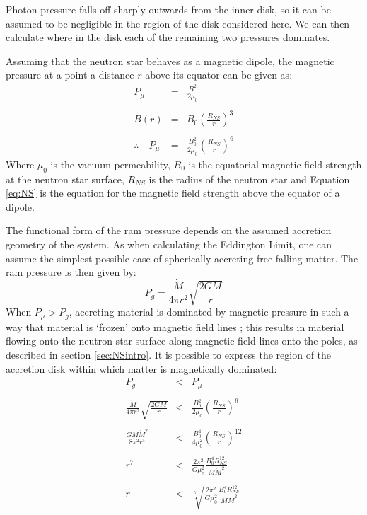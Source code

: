 \par Photon pressure falls off sharply outwards from the inner disk, so it can be assumed to be negligible in the region of the disk considered here.  We can then calculate where in the disk each of the remaining two pressures dominates.
\par Assuming that the neutron star behaves as a magnetic dipole, the magnetic pressure at a point a distance $r$ above its equator can be given as:
\begin{eqnarray}
P_\mu&=&\frac{B^2}{2\mu_0}\\ \nonumber \\
B(r)&=&B_0\left(\frac{R_{NS}}{r}\right)^3\label{eq:NS}\\ \nonumber \\
\therefore\quad P_\mu&=&\frac{B_0^2}{2\mu_0}\left(\frac{R_{NS}}{r}\right)^6
\end{eqnarray}
Where $\mu_0$ is the vacuum permeability, $B_0$ is the equatorial magnetic field strength at the neutron star surface, $R_{NS}$ is the radius of the neutron star and Equation \ref{eq:NS} is the equation for the magnetic field strength above the equator of a dipole.
\par The functional form of the ram pressure depends on the assumed accretion geometry of the system.  As when calculating the Eddington Limit, one can assume the simplest possible case of spherically accreting free-falling matter.  The ram pressure is then given by:
\begin{equation}
P_g=\frac{\dot{M}}{4\pi r^2}\sqrt{\frac{2GM}{r}}
\end{equation}
When $P_\mu>P_g$, accreting material is dominated by magnetic pressure in such a way that material is `frozen' onto magnetic field lines \citep{Alfven_Waves}; this results in material flowing onto the neutron star surface along magnetic field lines onto the poles, as described in section \ref{sec:NSintro}.  It is possible to express the region of the accretion disk within which matter is magnetically dominated:
\begin{eqnarray}
P_g&<&P_\mu\\ \nonumber \\
\frac{\dot{M}}{4\pi r^2}\sqrt{\frac{2GM}{r}}&<&\frac{B_0^2}{2\mu_0}\left(\frac{R_{NS}}{r}\right)^6\\ \nonumber \\
\frac{GM\dot{M}^2}{8\pi^2 r^5}&<&\frac{B_0^4}{4\mu_0^2}\left(\frac{R_{NS}}{r}\right)^{12}\\ \nonumber \\
r^7&<&\frac{2\pi^2}{G\mu_0^2}\frac{B_0^4R_{NS}^{12}}{M\dot{M}^2}\\ \nonumber \\
r&<&\sqrt[7]{\frac{2\pi^2}{G\mu_0^2}\frac{B_0^4R_{NS}^{12}}{M\dot{M}^2}}\label{eq:rmu}
\end{eqnarray}
